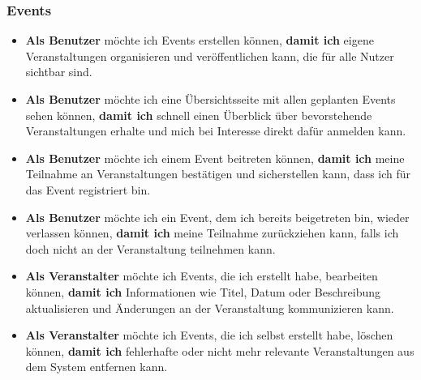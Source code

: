 \documentclass[a4paper,12pt]{article}
\begin{document}

\subsubsection{Events}
\begin{itemize}
  \item \textbf{Als Benutzer} möchte ich Events erstellen können, \textbf{damit ich} eigene Veranstaltungen organisieren und veröffentlichen kann, die für alle Nutzer sichtbar sind.
  \item \textbf{Als Benutzer} möchte ich eine Übersichtsseite mit allen geplanten Events sehen können, \textbf{damit ich} schnell einen Überblick über bevorstehende Veranstaltungen erhalte und mich bei Interesse direkt dafür anmelden kann.
  \item \textbf{Als Benutzer} möchte ich einem Event beitreten können, \textbf{damit ich} meine Teilnahme an Veranstaltungen bestätigen und sicherstellen kann, dass ich für das Event registriert bin.
  \item \textbf{Als Benutzer} möchte ich ein Event, dem ich bereits beigetreten bin, wieder verlassen können, \textbf{damit ich} meine Teilnahme zurückziehen kann, falls ich doch nicht an der Veranstaltung teilnehmen kann.
  \item \textbf{Als Veranstalter} möchte ich Events, die ich erstellt habe, bearbeiten können, \textbf{damit ich} Informationen wie Titel, Datum oder Beschreibung aktualisieren und Änderungen an der Veranstaltung kommunizieren kann.
  \item \textbf{Als Veranstalter} möchte ich Events, die ich selbst erstellt habe, löschen können, \textbf{damit ich} fehlerhafte oder nicht mehr relevante Veranstaltungen aus dem System entfernen kann.
\end{itemize}

\end{document}
